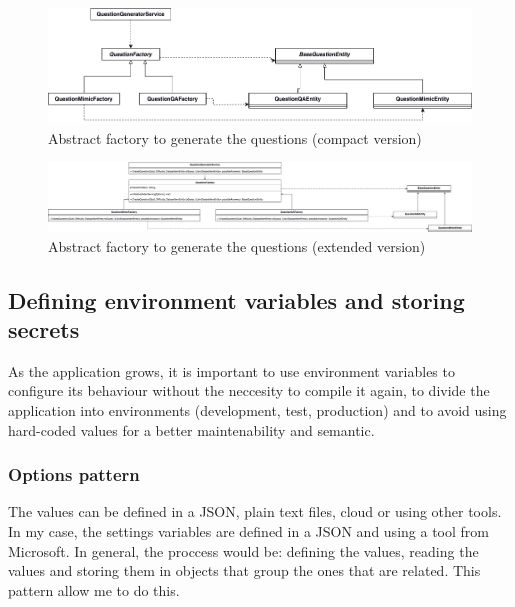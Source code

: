            \begin{figure}[H]
                \centering
                    \includegraphics[width=\textwidth]{assets/diagrams/abstractfactory1.png}
                \caption{Abstract factory to generate the questions (compact version)}
                \label{fig:implementation_af1}
            \end{figure}
            \newpage
            \begin{figure}[H]
                \centering
                    \includegraphics[angle=90, height=\textheight]{assets/diagrams/abstractfactory.png}
                \caption{Abstract factory to generate the questions (extended version)}
                \label{fig:implementation_af}
            \end{figure}

    \subsection{Defining environment variables and storing secrets}
        As the application grows, it is important to use environment variables to configure its behaviour without the neccesity to compile it again, to 
        divide the application into environments (development, test, production) and to avoid using hard-coded values for a better maintenability and 
        semantic.

        \subsubsection{Options pattern}
            The values can be defined in a JSON, plain text files, cloud or using other tools.
            In my case, the settings variables are defined in a JSON and using a tool from Microsoft.
            In general, the proccess would be: defining the values, reading the values and storing them in 
            objects that group the ones that are related.
            This pattern allow me to do this.

